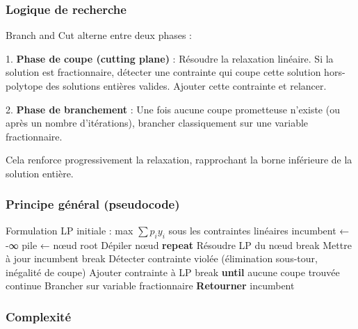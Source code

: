 \documentclass[11pt,a4paper]{article}
\begin{document}
\subsubsection*{Logique de recherche}

Branch and Cut alterne entre deux phases :

1. \textbf{Phase de coupe (cutting plane)} : Résoudre la relaxation linéaire. Si la solution est fractionnaire, détecter une contrainte qui coupe cette solution hors-polytope des solutions entières valides. Ajouter cette contrainte et relancer.

2. \textbf{Phase de branchement} : Une fois aucune coupe prometteuse n'existe (ou après un nombre d'itérations), brancher classiquement sur une variable fractionnaire.

Cela renforce progressivement la relaxation, rapprochant la borne inférieure de la solution entière.

\subsubsection*{Principe général (pseudocode)}

\begin{algorithm}[H]
\caption{Branch and Cut pour l'OP}
\begin{algorithmic}[1]
\State Formulation LP initiale : max $\sum p_i y_i$ sous les contraintes linéaires
\State incumbent ← -∞
\State pile ← {nœud root}
    \State Dépiler nœud
    \State \textbf{repeat}
        \State Résoudre LP du nœud
            \State break
        \EndIf
            \State Mettre à jour incumbent
            \State break
        \EndIf
        \State Détecter contrainte violée (élimination sous-tour, inégalité de coupe)
            \State Ajouter contrainte à LP
        \Else
            \State break
        \EndIf
    \State \textbf{until} aucune coupe trouvée
        \State continue
    \EndIf
    \State Brancher sur variable fractionnaire
\EndWhile
\State \textbf{Retourner} incumbent
\end{algorithmic}
\end{algorithm}

\subsubsection*{Complexité}
\end{document}
